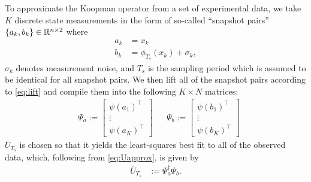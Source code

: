 To approximate the Koopman operator from a set of experimental data, we take $K$ discrete state measurements 
in the form of so-called ``snapshot pairs'' ${ \{ a_k , b_k \} \in \mathbb{R}^{n \times 2} }$ where
\begin{align}
    a_{k} &= x_k \\
    b_{k} &= \phi_{T_s} (x_k) + \sigma_k,
    \label{eq:ab}
\end{align}
$\sigma_k$ denotes measurement noise, and $T_s$ is the sampling period which is assumed to be identical for all snapshot pairs.
We then lift all of the snapshot pairs according to \eqref{eq:lift} and compile them into the following ${K \times N}$ matrices:
\begin{align}
    &\Psi_a := \begin{bmatrix} {\psi}(a_1)^\top \\ \vdots \\  {\psi}(a_K)^\top \end{bmatrix}
    &&\Psi_b := \begin{bmatrix} {\psi}(b_1)^\top \\ \vdots \\  {\psi}(b_K)^\top \end{bmatrix}
    \label{eq:Psi}
\end{align}
$\bar{U}_{T_s}$ is chosen so that it yields the least-squares best fit to all of the observed data, which, following from \eqref{eq:Uapprox}, is given by 
\begin{align}
    \bar{U}_{T_s} &:= \Psi_a^\dagger \Psi_b.
\end{align}

